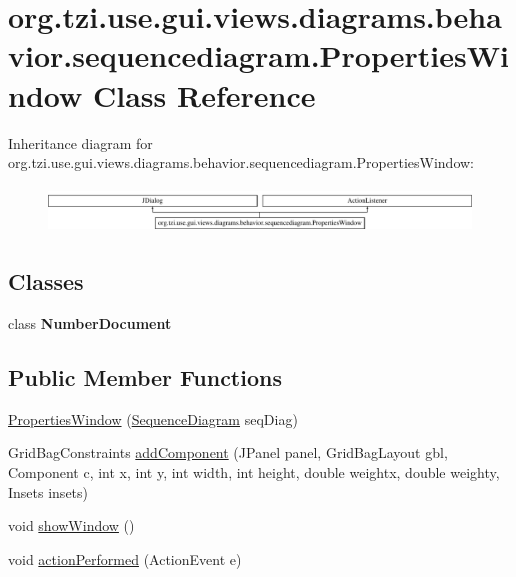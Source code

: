 \hypertarget{classorg_1_1tzi_1_1use_1_1gui_1_1views_1_1diagrams_1_1behavior_1_1sequencediagram_1_1_properties_window}{\section{org.\-tzi.\-use.\-gui.\-views.\-diagrams.\-behavior.\-sequencediagram.\-Properties\-Window Class Reference}
\label{classorg_1_1tzi_1_1use_1_1gui_1_1views_1_1diagrams_1_1behavior_1_1sequencediagram_1_1_properties_window}
}
Inheritance diagram for org.\-tzi.\-use.\-gui.\-views.\-diagrams.\-behavior.\-sequencediagram.\-Properties\-Window\-:\begin{figure}[H]
\begin{center}
\leavevmode
\includegraphics[height=1.233480cm]{classorg_1_1tzi_1_1use_1_1gui_1_1views_1_1diagrams_1_1behavior_1_1sequencediagram_1_1_properties_window}
\end{center}
\end{figure}
\subsection*{Classes}
\begin{DoxyCompactItemize}
\item 
class {\bfseries Number\-Document}
\end{DoxyCompactItemize}
\subsection*{Public Member Functions}
\begin{DoxyCompactItemize}
\item 
\hyperlink{classorg_1_1tzi_1_1use_1_1gui_1_1views_1_1diagrams_1_1behavior_1_1sequencediagram_1_1_properties_window_a1a8124bc6414708dcab2dc1766e6148a}{Properties\-Window} (\hyperlink{classorg_1_1tzi_1_1use_1_1gui_1_1views_1_1diagrams_1_1behavior_1_1sequencediagram_1_1_sequence_diagram}{Sequence\-Diagram} seq\-Diag)
\item 
Grid\-Bag\-Constraints \hyperlink{classorg_1_1tzi_1_1use_1_1gui_1_1views_1_1diagrams_1_1behavior_1_1sequencediagram_1_1_properties_window_ab05b942e35c2d3248dcbc941f9ab3aa9}{add\-Component} (J\-Panel panel, Grid\-Bag\-Layout gbl, Component c, int x, int y, int width, int height, double weightx, double weighty, Insets insets)
\item 
void \hyperlink{classorg_1_1tzi_1_1use_1_1gui_1_1views_1_1diagrams_1_1behavior_1_1sequencediagram_1_1_properties_window_a3098f220a36f93e4903efa4dd3fb04b7}{show\-Window} ()
\item 
void \hyperlink{classorg_1_1tzi_1_1use_1_1gui_1_1views_1_1diagrams_1_1behavior_1_1sequencediagram_1_1_properties_window_a48f0f4f57366388a982c067522959fe0}{action\-Performed} (Action\-Event e)
\end{DoxyCompactItemize}


